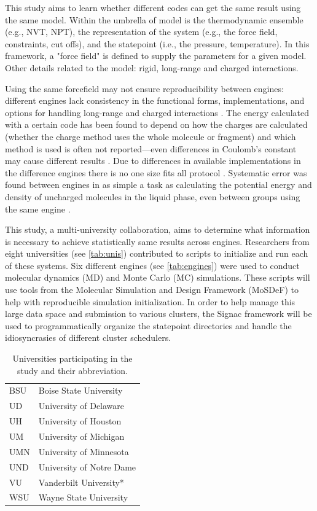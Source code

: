 This study aims to learn whether different codes can get the same result using the same model.
Within the umbrella of model is the thermodynamic ensemble (e.g., NVT, NPT), the representation of the system (e.g., the force field, constraints, cut offs), and the statepoint (i.e., the pressure, temperature).
In this framework, a "force field" is defined to supply the parameters for a given model.
Other details related to the model: rigid, long-range and charged interactions.

Using the same forcefield may not ensure reproducibility between engines: different engines lack consistency in the functional forms, implementations, and options for handling long-range and charged interactions \citep{Rizzi2020}. 
The energy calculated with a certain code has been found to depend on how the charges are calculated (whether the charge method uses the whole molecule or fragment) and which method is used is often not reported---even differences in Coulomb's constant may cause different results \citep{Shirts2017}.
Due to differences in available implementations in the difference engines there is no one size fits all protocol \citep{Loeffler2018}.
Systematic error was found between engines in as simple a task as calculating the potential energy and density of uncharged molecules in the liquid phase, even between groups using the same engine \citep{Schappals2017}.

This study, a multi-university collaboration, aims to determine what information is necessary to achieve statistically same results across engines.
Researchers from eight universities (see \autoref{tab:unis}) contributed to scripts to initialize and run each of these systems.
Six different engines (see \autoref{tab:engines}) were used to conduct molecular dynamics (MD) and Monte Carlo (MC) simulations.
These scripts will use tools from the Molecular Simulation and Design Framework (MoSDeF) to help with reproducible simulation initialization.
In order to help manage this large data space and submission to various clusters, the Signac framework will be used to programmatically organize the statepoint directories and handle the idiosyncrasies of different cluster schedulers.

\begin{table}
\caption{Universities participating in the study and their abbreviation.}\label{tab:unis}
\centering
\begin{tabular}{ll}
BSU & Boise State University \\
UD & University of Delaware \\
UH & University of Houston \\
UM & University of Michigan \\
UMN & University of Minnesota \\
UND & University of Notre Dame \\
VU & Vanderbilt University* \\
WSU & Wayne State University
\end{tabular}
\end{table}

